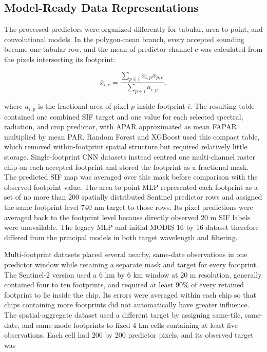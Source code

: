 \subsection{Model-Ready Data Representations}

The processed predictors were organized differently for tabular, area-to-point, and convolutional models. In the polygon-mean branch, every accepted sounding became one tabular row, and the mean of predictor channel $c$ was calculated from the pixels intersecting its footprint:

\begin{equation}
    \bar{x}_{i,c}=
    \frac{\sum_{p\in i}a_{i,p}x_{p,c}}
         {\sum_{p\in i}a_{i,p}},
    \label{eq:polygon_weighted_mean}
\end{equation}

where $a_{i,p}$ is the fractional area of pixel $p$ inside footprint $i$. The resulting table contained one combined SIF target and one value for each selected spectral, radiation, and crop predictor, with APAR approximated as mean FAPAR multiplied by mean PAR. Random Forest and XGBoost used this compact table, which removed within-footprint spatial structure but required relatively little storage. Single-footprint CNN datasets instead centred one multi-channel raster chip on each accepted footprint and stored the footprint as a fractional mask. The predicted SIF map was averaged over this mask before comparison with the observed footprint value. The area-to-point MLP represented each footprint as a set of no more than 200 spatially distributed Sentinel predictor rows and assigned the same footprint-level 740 nm target to those rows. Its pixel predictions were averaged back to the footprint level because directly observed 20 m SIF labels were unavailable. The legacy MLP and initial MODIS 16 by 16 dataset therefore differed from the principal models in both target wavelength and filtering.

Multi-footprint datasets placed several nearby, same-date observations in one predictor window while retaining a separate mask and target for every footprint. The Sentinel-2 version used a 6 km by 6 km window at 20 m resolution, generally contained four to ten footprints, and required at least 90\% of every retained footprint to lie inside the chip. Its errors were averaged within each chip so that chips containing more footprints did not automatically have greater influence. The spatial-aggregate dataset used a different target by assigning same-tile, same-date, and same-mode footprints to fixed 4 km cells containing at least five observations. Each cell had 200 by 200 predictor pixels, and its observed target was

